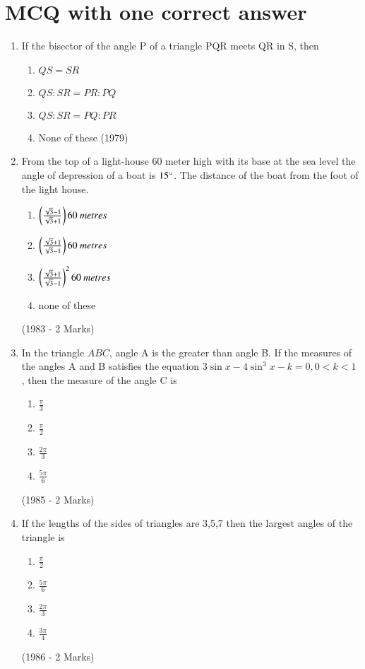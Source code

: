 \documentclass[journal,12pt,twocolumn]{IEEEtran}
\theoremstyle{remark}
\begin{document}
\section{MCQ with one correct answer}
\begin{enumerate}
    \item If the bisector of the angle P of a triangle PQR meets QR in S, then
\begin{multicols}{4}
    \begin{enumerate}
        \item $QS = SR$
        \item $QS : SR = PR : PQ$
        \item $QS : SR = PQ : PR$
        \item None of these \hfill (1979)
    \end{enumerate}
\end{multicols}
    \item From the top of a light-house 60 meter high with its base at the sea level the angle of depression of a boat is  $15\degree$. The distance of the boat from the foot of the light house.
	    \begin{multicols}{2}    
\begin{enumerate}
    \item $\brak{\frac{\sqrt{3}-1}{\sqrt{3}+1}}60\ metres $
    \item $\brak{\frac{\sqrt{3}+1}{\sqrt{3}-1}}60\ metres $
    \item $\left(\frac{\sqrt{3}+1}{\sqrt{3}-1}\right)^2 60\ metres $
    \item none of these 
\end{enumerate}
	    \end{multicols}
		 \hfill (1983 - 2 Marks)
    \item In the triangle $ABC$, angle A is the greater than angle B. If the measures of the angles A and B satisfies the equation $3\sin x - 4 \sin^3 x - k = 0, 0<k<1$ , then the measure of the angle C is 
	    \begin{multicols}{2}
	    \begin{enumerate}
     \item $\frac{\pi}{3}$
     \item $\frac{\pi}{2}$
     \item $\frac{2\pi}{3}$
     \item $\frac{5\pi}{6}$ 
\end{enumerate}
	    \end{multicols}
		\hfill (1985 - 2 Marks)
    \item If the lengths of the sides of triangles are 3,5,7 then the largest angles of the triangle is
	    \begin{multicols}{2}
	    \begin{enumerate}
     \item $\frac{\pi}{2}$
     \item $\frac{5\pi}{6}$
     \item $\frac{2\pi}{3}$
     \item $\frac{3\pi}{4}$ 
	    \end{enumerate}
	    \end{multicols}
		\hfill (1986 - 2 Marks)

\end{enumerate}
\end{document}
